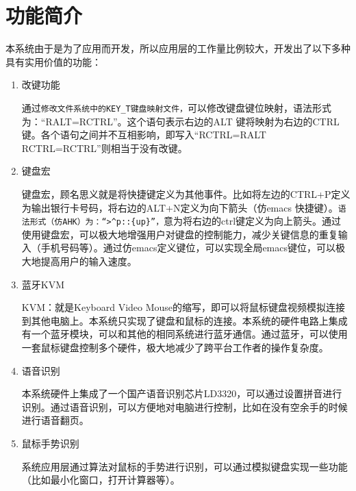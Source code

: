 \section{功能简介}
本系统由于是为了应用而开发，所以应用层的工作量比例较大，开发出了以下多种具有实用价值的功能：
\begin{enumerate}
\item 改键功能

通过\verb|修改文件系统中的KEY_T键盘映射文件，|可以修改键盘键位映射，语法形式为：“RALT=RCTRL”。这个语句表示右边的ALT 键将映射为右边的CTRL键。各个语句之间并不互相影响，即写入“RCTRL=RALT RCTRL=RCTRL”则相当于没有改键。

\item 键盘宏

键盘宏，顾名思义就是将快捷键定义为其他事件。比如将左边的CTRL+P定义为输出银行卡号码，将右边的ALT+N定义为向下箭头（仿emacs 快捷键）。\verb|语法形式（仿AHK）为：“>^p::{up}”，|意为将右边的ctrl键定义为向上箭头。通过使用键盘宏，可以极大地增强用户对键盘的控制能力，减少关键信息的重复输入（手机号码等）。通过仿emacs定义键位，可以实现全局emacs键位，可以极大地提高用户的输入速度。

\item 蓝牙KVM

KVM：就是Keyboard Video Mouse的缩写，即可以将鼠标键盘视频模拟连接到其他电脑上。本系统只实现了键盘和鼠标的连接。本系统的硬件电路上集成有一个蓝牙模块，可以和其他的相同系统进行蓝牙通信。通过蓝牙，可以使用一套鼠标键盘控制多个硬件，极大地减少了跨平台工作者的操作复杂度。

\item 语音识别

本系统硬件上集成了一个国产语音识别芯片LD3320，可以通过设置拼音进行识别。通过语音识别，可以方便地对电脑进行控制，比如在没有空余手的时候进行语音翻页。

\item 鼠标手势识别

系统应用层通过算法对鼠标的手势进行识别，可以通过模拟键盘实现一些功能（比如最小化窗口，打开计算器等）。
\end{enumerate}












